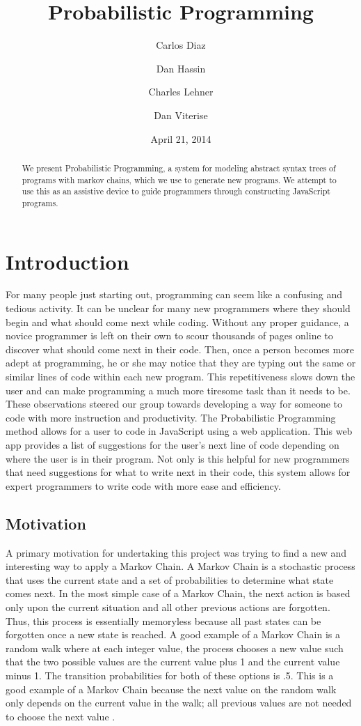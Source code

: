 \documentclass{article}
\title{
Probabilistic Programming
}
\author{
	Carlos Diaz
	\and
	Dan Hassin
	\and
	Charles Lehner
	\and
	Dan Viterise
}
\date{April 21, 2014}
\begin{document}
\maketitle

\begin{abstract}
	We present Probabilistic Programming, a system for modeling abstract syntax
	trees of programs with markov chains, which we use to generate new programs.
	We attempt to use this as an assistive device to guide programmers through
	constructing JavaScript programs.
\end{abstract}

\section{Introduction}
For many people just starting out, programming can seem like a confusing and
tedious activity. It can be unclear for many new programmers where they should
begin and what should come next while coding. Without any proper guidance, a
novice programmer is left on their own to scour thousands of pages online to
discover what should come next in their code. Then, once a person becomes more
adept at programming, he or she may notice that they are typing out the same or
similar lines of code within each new program. This repetitiveness slows down
the user and can make programming a much more tiresome task than it needs to be.
These observations steered our group towards developing a way for someone to
code with more instruction and productivity. The Probabilistic Programming
method allows for a user to code in JavaScript using a web application. This web
app provides a list of suggestions for the user's next line of code depending on
where the user is in their program. Not only is this helpful for new programmers
that need suggestions for what to write next in their code, this system allows
for expert programmers to write code with more ease and efficiency.

\subsection{Motivation}

A primary motivation for undertaking this project was trying to find a new and
interesting way to apply a Markov Chain.  A Markov Chain is a stochastic process
that uses the current state and a set of probabilities to determine what state
comes next. In the most simple case of a Markov Chain, the next action is based
only upon the current situation and all other previous actions are forgotten.
Thus, this process is essentially memoryless because all past states can be
forgotten once a new state is reached. A good example of a Markov Chain is a
random walk where at each integer value, the process chooses a new value such
that the two possible values are the current value plus 1 and the current value
minus 1. The transition probabilities for both of these options is .5. This is a
good example of a Markov Chain because the next value on the random walk only
depends on the current value in the walk; all previous values are not needed to
choose the next value \cite{markov}.
\end{document}
